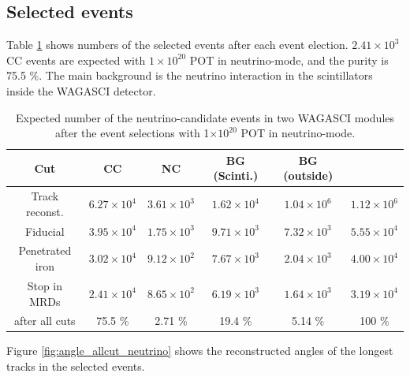 \subsection{Selected events}

Table \ref{tab:expected_num_events_neutrino_beam} shows numbers of the selected events after each event election.
$2.41 \times 10^{3}$ CC events are expected with $1 \times 10^{20}$  POT in neutrino-mode, and the purity is 75.5 \%.
The main background is the neutrino interaction in the scintillators inside the WAGASCI detector.

\begin{table}[htb]
  \begin{center}
    \caption{Expected number of the neutrino-candidate events in two WAGASCI modules after the event selections with 1$\times 10^{20}$ POT in neutrino-mode.}
    \begin{tabular}{c|cccc|c} \hline
      Cut & CC & NC & BG (Scinti.) & BG (outside) \\ \hline
     Track reconst. & $6.27 \times 10^{4}$  & $3.61\times10^{3}$ & $1.62 \times10^{4}$ & $1.04 \times 10^{6}$ & $1.12 \times 10^{6}$ \\
     Fiducial & $3.95 \times 10^{4}$  & $1.75 \times10^{3}$ & $9.71 \times10^{3}$ & $7.32 \times 10^{3}$ & $5.55 \times 10^{4}$ \\
     Penetrated iron & $3.02 \times 10^{4}$  & $9.12 \times10^{2}$ & $7.67 \times10^{3}$ & $2.04 \times 10^{3}$ & $4.00 \times 10^{4}$ \\
     Stop in MRDs & $2.41 \times 10^{4}$  & $8.65 \times10^{2}$ & $6.19 \times10^{3}$ & $1.64 \times 10^{3}$ & $3.19 \times 10^{4}$ \\ \hline
     after all cuts & 75.5 \% & 2.71 \% & 19.4 \% & 5.14 \% & 100 \% \\
    \end{tabular}
    \label{tab:expected_num_events_neutrino_beam}
  \end{center}
\end{table}


Figure \ref{fig:angle_allcut_neutrino} shows the reconstructed angles of the longest tracks in the selected events.

